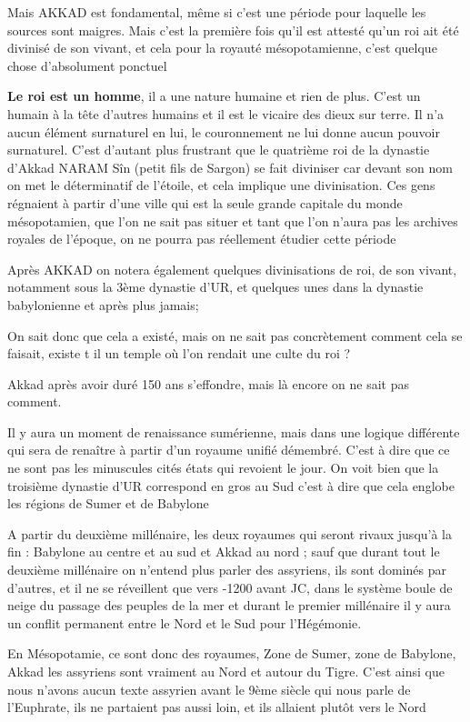 \documentclass[a4paper,10pt]{article}
\begin{document}
Mais AKKAD est fondamental, même si c'est une période
pour laquelle les sources sont maigres. Mais c'est la
première fois qu'il est attesté qu'un
roi ait été divinisé de son vivant, et cela pour la royauté
mésopotamienne, c'est quelque chose
d'absolument ponctuel

\textbf{Le roi est un homme}, il a une nature humaine et rien de plus. 
C'est un humain à la tête d'autres
humains et il est le vicaire des dieux sur terre. Il
n'a aucun élément surnaturel en lui, le couronnement
ne lui donne aucun pouvoir surnaturel. C'est
d'autant plus frustrant que le quatrième roi de la
dynastie d'Akkad NARAM Sîn (petit fils de Sargon) se
fait diviniser car devant son nom on met le déterminatif de
l'étoile, et cela implique une divinisation. Ces gens
régnaient à partir d'une ville qui est la seule grande
capitale du monde mésopotamien, que l'on ne sait pas
situer et tant que l'on n'aura pas
les archives royales de l'époque, on ne pourra pas
réellement étudier cette période

Après AKKAD on notera également quelques divinisations de roi, de son
vivant, notamment sous la 3ème dynastie d'UR, et
quelques unes dans la dynastie babylonienne et après plus jamais;

On sait donc que cela a existé, mais on ne sait pas concrètement comment
cela se faisait, existe t il un temple où l'on rendait
une culte du roi ?

Akkad après avoir duré  150 ans s'effondre, mais là
encore on ne sait pas comment.

Il y aura un moment de renaissance sumérienne, mais dans une logique
différente qui sera de renaître à partir d'un royaume
unifié démembré. C'est à dire que ce ne sont pas les
minuscules cités états qui revoient le jour. On voit bien que la
troisième dynastie d'UR correspond en gros au Sud
c'est  à dire que cela englobe les régions de Sumer et
de Babylone

A partir du deuxième millénaire, les deux royaumes qui seront rivaux
jusqu'à la fin  : Babylone au centre et au sud et
Akkad au nord ; sauf que durant tout le deuxième millénaire on
n'entend plus parler des assyriens, ils sont dominés
par d'autres, et il ne se réveillent que vers -1200
avant JC, dans le système boule de neige du passage des peuples de la
mer et durant le premier millénaire il y aura un conflit permanent
entre le Nord et le Sud pour l'Hégémonie.

En Mésopotamie, ce sont donc des royaumes, Zone de Sumer, zone de
Babylone, Akkad les  assyriens sont vraiment  au Nord et autour du
Tigre. C'est ainsi que nous n'avons
aucun texte assyrien avant le 9ème siècle qui nous parle de
l'Euphrate, ils ne partaient pas aussi loin, et ils
allaient plutôt vers le Nord
\end{document}
